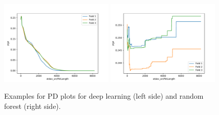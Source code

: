 \documentclass[sigconf,nonacm]{acmart}
\begin{document}
\begin{figure}[p]
\includegraphics[width=0.48\textwidth]{plots/pdp/apply(stdev(ipTotalLength),forward)_nn.pdf}
\includegraphics[width=0.48\textwidth]{plots/pdp/apply(stdev(ipTotalLength),forward)_rf.pdf}

\caption{Examples for PD plots for deep learning (left side) and random forest (right side).}
\label{fig:pdp}
\end{figure}
\end{document}
